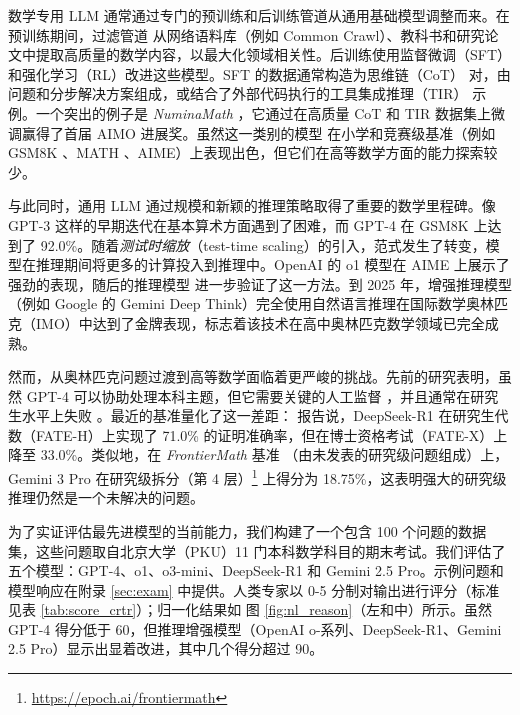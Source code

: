 \documentclass[11pt]{article}
\numberwithin{equation}{section}
\begin{document}
数学专用 LLM 通常通过专门的预训练和后训练管道从通用基础模型调整而来。在预训练期间，过滤管道 \cite{shao2024deepseekmath,yang2024qwen2} 从网络语料库（例如 Common Crawl）、教科书和研究论文中提取高质量的数学内容，以最大化领域相关性。后训练使用监督微调（SFT）和强化学习（RL）改进这些模型。SFT 的数据通常构造为思维链（CoT）\cite{wei2022chain} 对，由问题和分步解决方案组成，或结合了外部代码执行的工具集成推理（TIR）\cite{goutora} 示例。一个突出的例子是 \textit{NuminaMath} \cite{li2024numinamath}，它通过在高质量 CoT 和 TIR 数据集上微调赢得了首届 AIMO 进展奖。虽然这一类别的模型 \cite{azerbayev2024llemma,shao2024deepseekmath,yang2024qwen2,ying2024internlm} 在小学和竞赛级基准（例如 GSM8K \cite{cobbe2021training}、MATH \cite{hendrycksmath2021}、AIME）上表现出色，但它们在高等数学方面的能力探索较少。

与此同时，通用 LLM 通过规模和新颖的推理策略取得了重要的数学里程碑。像 GPT-3 这样的早期迭代在基本算术方面遇到了困难，而 GPT-4 \cite{achiam2023gpt} 在 GSM8K 上达到了 92.0\%。随着\textit{测试时缩放}（test-time scaling）的引入，范式发生了转变，模型在推理期间将更多的计算投入到推理中。OpenAI 的 o1 模型在 AIME 上展示了强劲的表现，随后的推理模型 \cite{guo2025deepseek,qwq32b,yang2025qwen3,comanici2025gemini} 进一步验证了这一方法。到 2025 年，增强推理模型（例如 Google 的 Gemini Deep Think）完全使用自然语言推理在国际数学奥林匹克（IMO）中达到了金牌表现，标志着该技术在高中奥林匹克数学领域已完全成熟。

然而，从奥林匹克问题过渡到高等数学面临着更严峻的挑战。先前的研究表明，虽然 GPT-4 可以协助处理本科主题，但它需要关键的人工监督 \cite{collins2024evaluating}，并且通常在研究生水平上失败 \cite{NEURIPS2023_58168e8a}。最近的基准量化了这一差距：\cite{jiang2025fate} 报告说，DeepSeek-R1 在研究生代数（FATE-H）上实现了 71.0\% 的证明准确率，但在博士资格考试（FATE-X）上降至 33.0\%。类似地，在 \textit{FrontierMath} 基准 \cite{glazer2024frontiermath}（由未发表的研究级问题组成）上，Gemini 3 Pro 在研究级拆分（第 4 层）\footnote{\href{https://epoch.ai/frontiermath}{https://epoch.ai/frontiermath}} 上得分为 18.75\%，这表明强大的研究级推理仍然是一个未解决的问题。

为了实证评估最先进模型的当前能力，我们构建了一个包含 100 个问题的数据集，这些问题取自北京大学（PKU）11 门本科数学科目的期末考试。我们评估了五个模型：GPT-4、o1、o3-mini、DeepSeek-R1 和 Gemini 2.5 Pro。示例问题和模型响应在附录 \ref{sec:exam} 中提供。人类专家以 0-5 分制对输出进行评分（标准见表 \ref{tab:score_crtr}）；归一化结果如 图 \ref{fig:nl_reason}（左和中）所示。虽然 GPT-4 得分低于 60，但推理增强模型（OpenAI o-系列、DeepSeek-R1、Gemini 2.5 Pro）显示出显着改进，其中几个得分超过 90。
\end{document}
